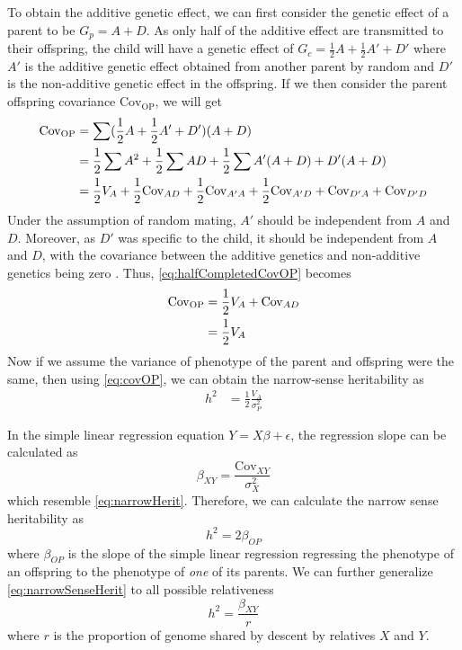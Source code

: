 	To obtain the additive genetic effect, we can first consider the genetic effect of a parent to be $G_p=A+D$. 
	As only half of the additive effect are transmitted to their offspring, the child will have a genetic effect of $G_c=\frac{1}{2}A+\frac{1}{2}A'+D'$ where $A'$ is the additive genetic effect obtained from another parent by random and $D'$ is the non-additive genetic effect in the offspring.
	If we then consider the parent offspring covariance $\mathrm{Cov_{OP}}$, we will get
	\begin{align}
	\mathrm{Cov_{OP}}&= \sum(\frac{1}{2}A+\frac{1}{2}A'+D')(A+D)\notag\\
	&=\frac{1}{2}\sum A^2+\frac{1}{2}\sum AD + \frac{1}{2}\sum A'(A+D) +D'(A+D) \notag\\ 
	&=\frac{1}{2}V_A+ \frac{1}{2}\mathrm{Cov}_{AD} + \frac{1}{2}\mathrm{Cov}_{A'A} + \frac{1}{2}\mathrm{Cov}_{A'D} +\mathrm{Cov}_{D'A} +\mathrm{Cov}_{D'D}  
	\label{eq:halfCompletedCovOP}
	\end{align} 
	Under the assumption of random mating,  $A'$ should be independent from $A$ and $D$. 
	Moreover, as $D'$ was specific to the child, it should be independent from $A$ and $D$, with the covariance between the additive genetics and non-additive genetics being zero \citep{Falconer1996}.
	Thus, \cref{eq:halfCompletedCovOP} becomes
	\begin{align}
	\mathrm{Cov_{OP}} &= \frac{1}{2}V_A+\mathrm{Cov}_{AD} \notag\\
	&= \frac{1}{2}V_A
	\label{eq:covOP}
	\end{align}
	Now if we assume the variance of phenotype of the parent and offspring were the same, then using \cref{eq:covOP}, we can obtain the narrow-sense heritability as
	\begin{align}
	h^2 &= \frac{1}{2}\frac{V_A}{\sigma_P^2}
	\label{eq:narrowHerit}
	\end{align}

	In the simple linear regression equation $Y=X\beta+\epsilon$, the regression slope can be calculated as 
	\begin{equation}
	\beta_{XY} = \frac{\mathrm{Cov}_{XY}}{\sigma_{X}^2}
	\end{equation}
	which resemble \cref{eq:narrowHerit}. 
	Therefore,  we can calculate the narrow sense heritability as
	\begin{equation}
	h^2 = 2\beta_{OP}
	\label{eq:narrowSenseHerit}
	\end{equation}
	where $\beta_{OP}$ is the slope of the simple linear regression regressing the phenotype of an offspring to the phenotype of \emph{one} of its parents.
	We can further generalize \cref{eq:narrowSenseHerit} to all possible relativeness 
	\begin{equation}
	h^2=\frac{\beta_{XY}}{r}
	\label{eq:finalNarrow}
	\end{equation}
	where $r$ is the proportion of genome shared by descent by relatives $X$ and $Y$.
	
